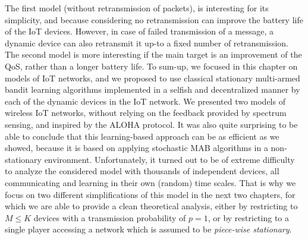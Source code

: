The first model (without retransmission of packets),
is interesting for its simplicity, and because considering no retransmission can improve the battery life of the IoT devices.
%
However, in case of failed transmission of a message, a dynamic device can also retransmit it up-to a fixed number of retransmission.
%
The second model is more interesting if the main target is an improvement of the QoS, rather than a longer battery life.
%
%
%
To sum-up, we focused in this chapter on models of IoT networks, and we proposed to use classical stationary multi-armed bandit learning algorithms implemented in a selfish and decentralized manner by each of the dynamic devices in the IoT network.
We presented two models of wireless IoT networks, without relying on the feedback provided by spectrum sensing, and inspired by the ALOHA protocol.
%
It was also quite surprising to be able to conclude that this learning-based approach can be as efficient as we showed,
because it is based on applying stochastic MAB algorithms in a non-stationary environment.
Unfortunately, it turned out to be of extreme difficulty to analyze the considered model with thousands of independent devices, all communicating and learning in their own (random) time scales.
That is why we focus on two different simplifications of this model in the next two chapters, for which we are able to provide a clean theoretical analysis,
either by restricting to $M \leq K$ devices with a transmission probability of $p=1$, or by restricting to a single player accessing a network which is assumed to be \emph{piece-wise stationary}.



